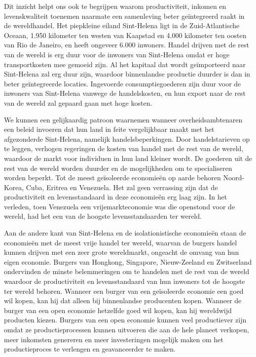 Dit inzicht helpt ons ook te begrijpen waarom productiviteit, inkomen en levenskwaliteit toenemen naarmate een samenleving beter geïntegreerd raakt in de wereldhandel. Het piepkleine eiland Sint-Helena ligt in de Zuid-Atlantische Oceaan, 1.950 kilometer ten westen van Kaapstad en 4.000 kilometer ten oosten van Rio de Janeiro, en heeft ongeveer 6.000 inwoners. Handel drijven met de rest van de wereld is erg duur voor de inwoners van Sint-Helena omdat er hoge transportkosten mee gemoeid zijn. Al het kapitaal dat wordt geïmporteerd naar Sint-Helena zal erg duur zijn, waardoor binnenlandse productie duurder is dan in beter geïntegreerde locaties. Ingevoerde consumptiegoederen zijn duur voor de inwoners van Sint-Helena vanwege de handelskosten, en hun export naar de rest van de wereld zal gepaard gaan met hoge kosten.

We kunnen een gelijkaardig patroon waarnemen wanneer overheidsambtenaren een beleid invoeren dat hun land in feite vergelijkbaar maakt met het afgezonderde Sint-Helena, namelijk handelsbeperkingen. Door handelstarieven op te leggen, verhogen regeringen de kosten van handel met de rest van de wereld, waardoor de markt voor individuen in hun land kleiner wordt. De goederen uit de rest van de wereld worden duurder en de mogelijkheden om te specialiseren worden beperkt. Tot de meest geïsoleerde economieën op aarde behoren Noord-Korea, Cuba, Eritrea en Venezuela. Het zal geen verrassing zijn dat de productiviteit en levensstandaard in deze economieën erg laag zijn. In het verleden, toen Venezuela een vrijemarkteconomie was die openstond voor de wereld, had het een van de hoogste levensstandaarden ter wereld.

Aan de andere kant van Sint-Helena en de isolationistische economieën staan de economieën met de meest vrije handel ter wereld, waarvan de burgers handel kunnen drijven met een zeer grote wereldmarkt, ongeacht de omvang van hun eigen economie. Burgers van Hongkong, Singapore, Nieuw-Zeeland en Zwitserland ondervinden de minste belemmeringen om te handelen met de rest van de wereld waardoor de productiviteit en levensstandaard van hun inwoners tot de hoogste ter wereld behoren. Wanneer een burger van een geïsoleerde economie een goed wil kopen, kan hij dat alleen bij binnenlandse producenten kopen. Wanneer de burger van een open economie hetzelfde goed wil kopen, kan hij wereldwijd producten kiezen. Burgers van een open economie kunnen veel productiever zijn omdat ze productieprocessen kunnen uitvoeren die aan de hele planeet verkopen, meer inkomsten genereren en meer investeringen mogelijk maken om het productieproces te verlengen en geavanceerder te maken.


